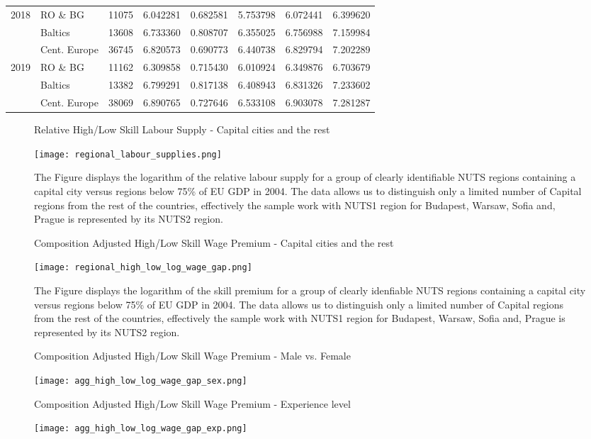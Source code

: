 \documentclass[11pt]{article}
\begin{document}
\begin{table}[!htbp]
{\begin{tabular}{llrrrrrr}
2018 & RO \& BG &  11075 &  6.042281 &  0.682581 &  5.753798 &  6.072441 &  6.399620 \\
     & Baltics &  13608 &  6.733360 &  0.808707 &  6.355025 &  6.756988 &  7.159984 \\
     & Cent. Europe &  36745 &  6.820573 &  0.690773 &  6.440738 &  6.829794 &  7.202289 \\
2019 & RO \& BG &  11162 &  6.309858 &  0.715430 &  6.010924 &  6.349876 &  6.703679 \\
     & Baltics &  13382 &  6.799291 &  0.817138 &  6.408943 &  6.831326 &  7.233602 \\
     & Cent. Europe &  38069 &  6.890765 &  0.727646 &  6.533108 &  6.903078 &  7.281287 \\
\bottomrule
\end{tabular}
}
\end{table}

\begin{figure}[!htbp]%
        \centering
        \caption{Relative High/Low Skill Labour Supply - Capital cities and the rest }
        {\texttt{[image: regional\_labour\_supplies.png]}}
        \label{regional_labour_supplies}
        \caption*{\footnotesize The Figure displays the logarithm of the relative labour supply for a group of clearly identifiable NUTS regions containing a capital city versus regions below 75\% of EU GDP in 2004. The data allows us to distinguish only a limited number of Capital regions from the rest of the countries, effectively the sample work with NUTS1 region for Budapest, Warsaw, Sofia and, Prague is represented by its NUTS2 region. }
\end{figure}


\begin{figure}[!htbp]%
        \centering
        \caption{Composition Adjusted High/Low Skill Wage Premium - Capital cities and the rest}
        {\texttt{[image: regional\_high\_low\_log\_wage\_gap.png]}}
        \label{regional_high_low_log_wage_gap}
        \caption*{\footnotesize  The Figure displays the logarithm of the skill premium for a group of clearly idenfiable NUTS regions containing a capital city versus regions below 75\% of EU GDP in 2004. The data allows us to distinguish only a limited number of Capital regions from the rest of the countries, effectively the sample work with NUTS1 region for Budapest, Warsaw, Sofia and, Prague is represented by its NUTS2 region.}
\end{figure}


\begin{figure}[!htbp]%
        \centering
        \caption{Composition Adjusted High/Low Skill Wage Premium - Male vs. Female }
        {\texttt{[image: agg\_high\_low\_log\_wage\_gap\_sex.png]}}
        \label{agg_high_low_log_wage_gap_sex}
        \caption*{\footnotesize }
\end{figure}

\begin{figure}[!htbp]%
        \centering
        \caption{Composition Adjusted High/Low Skill Wage Premium - Experience level }
        {\texttt{[image: agg\_high\_low\_log\_wage\_gap\_exp.png]}}
        \label{agg_high_low_log_wage_gap_exp}
        \caption*{\footnotesize }
\end{figure}
\end{document}
